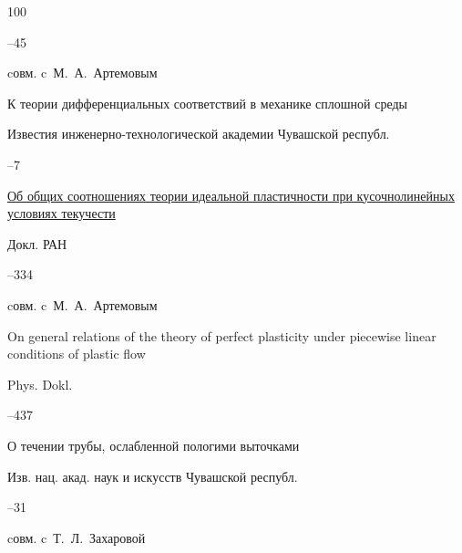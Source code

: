 \begin{thebibliography}{100}


–45

\miscnote cовм. c~М.~А.~Артемовым




\paper К теории дифференциальных соответствий в механике сплошной среды 

\jour Известия инженерно-технологической академии Чувашской республ.



–7




\paper \href{https://zbmath.org/?q=an:0899.73124}{Об общих соотношениях теории идеальной пластичности при кусочнолинейных условиях текучести}


\jour Докл. РАН




–334 

\miscnote cовм. c~М.~А.~Артемовым

\transl


\paper \linebreak On general relations of the theory of perfect plasticity under piecewise linear conditions of plastic flow

\jour Phys. Dokl.



--437 





\paper О течении трубы, ослабленной пологими выточками 

\jour Изв. нац. акад. наук и искусств Чувашской республ.



–31 

\miscnote cовм. c~Т.~Л.~Захаровой





\end{thebibliography}
